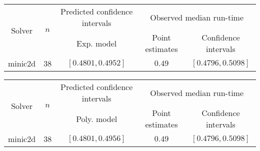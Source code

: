 \begin{tabular}{ccccc}
\hline 
\multirow{2}{*}{Solver} & \multirow{2}{*}{$n$} & Predicted confidence intervals & \multicolumn{2}{c}{Observed median  run-time}\tabularnewline
 &  & Exp. model  & Point estimates  & Confidence intervals\tabularnewline
\hline 
\hline 
\multirow{0}{*}{minic2d} & 38 & $\mathbf{\left[0.4801,0.4952\right]}$ & $0.49$ & $\left[0.4796,0.5098\right]$ \tabularnewline 
\hline 
\end{tabular} 

\begin{tabular}{ccccc}
\hline 
\multirow{2}{*}{Solver} & \multirow{2}{*}{$n$} & Predicted confidence intervals & \multicolumn{2}{c}{Observed median  run-time}\tabularnewline
 &  & Poly. model  & Point estimates  & Confidence intervals\tabularnewline
\hline 
\hline 
\multirow{0}{*}{minic2d} & 38 & $\mathbf{\left[0.4801,0.4956\right]}$ & $0.49$ & $\left[0.4796,0.5098\right]$ \tabularnewline 
\hline 
\end{tabular} 


